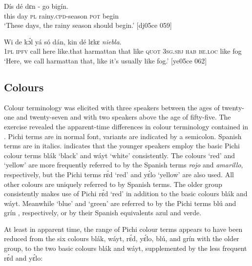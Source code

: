 \ea%
    \label{ex:key:1749}
    \gll Dís  dé  dɛn  -    go  bigín.\\
this  day  \textsc{pl}  rainy.\textsc{cpd}{}-season  \textsc{pot}  begin\\

\glt ‘These days, the rainy season should begin.’ [dj05ce 059]
\z


\ea
\label{ex:key:1750}
\gll
  Wi  de  kɔ́l  yá    só        dán,    
 kin  dé    lɛkɛ  \textit{niebla}.\\
\textsc{1pl}  \textsc{ipfv}  call  here    like.that  harmattan  that    like  \textsc{quot}
\textsc{3sg.sbj}  \textsc{hab}  \textsc{be.loc}  like  fog \\
\glt ‘Here, we call harmattan that, like it’s usually like fog.’ [ye05ce 062]
\z

\subsection{Colours}

Colour terminology was elicited with three speakers between the ages of twenty-one and twenty-seven and with two speakers above the age of fifty-five. The exercise revealed the apparent-time differences in colour terminology contained in . Pichi terms are in normal font, variants are indicated by a semicolon. Spanish terms are in italics.  indicates that the younger speakers employ the basic Pichi colour terms blák ‘black’ and wáyt ‘white’ consistently. The colours ‘red’ and ‘yellow’ are more frequently referred to by the Spanish terms \textit{rojo} and \textit{amarillo}, respectively, but the Pichi terms rɛ́d ‘red’ and yɛ́lo ‘yellow’ are also used. All other colours are uniquely referred to by Spanish terms{\fff}. The older group consistently makes use of Pichi rɛ́d ‘red’ in addition to the basic colours blák and wáyt. Meanwhile ‘blue’ and ‘green’ are referred to by the Pichi terms blú and grín , respectively, or by their Spanish equivalents azul and verde. 


At least in apparent time, the range of Pichi colour terms appears to have been reduced from the six colours blák, wáyt, rɛ́d, yɛ́lo, blú, and grín with the older group, to the two basic colours blák and wáyt, supplemented by the less frequent rɛ́d and yɛ́lo: 



